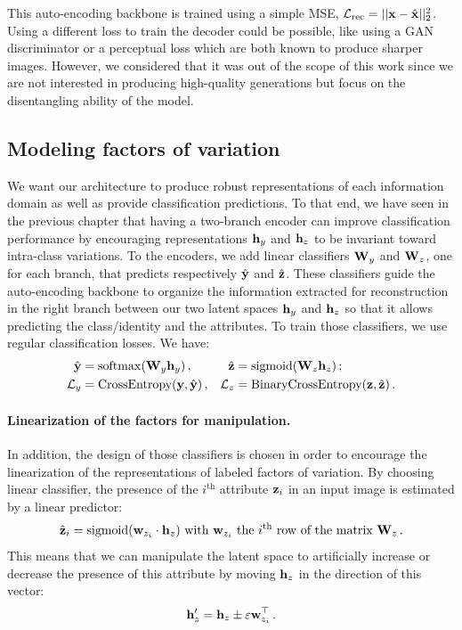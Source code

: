 This auto-encoding backbone is trained using a simple \ac{MSE}, $\mathcal{L}_\textrm{rec} = ||\mathbf{x} - \hat{\mathbf{x}}||_2^2$. Using a different loss to train the decoder could be possible, like using a GAN discriminator \citep{Goodfellow2014} or a perceptual loss \citep{dosovitskiy2016generating} which are both known to produce sharper images. However, we considered that it was out of the scope of this work since we are not interested in producing high-quality generations but focus on the disentangling ability of the model.


\subsection{Modeling factors of variation}\label{dualdis:sec:model_factors}

We want our architecture to produce robust representations of each information domain as well as provide classification predictions. To that end, we have seen in the previous chapter that having a two-branch encoder can improve classification performance by encouraging representations $\mathbf{h}_y$ and $\mathbf{h}_z$ to be invariant toward intra-class variations. To the encoders, we add linear classifiers $\mathbf{W}_y$ and $\mathbf{W}_z$, one for each branch, that predicts respectively $\hat{\mathbf{y}}$ and $\hat{\mathbf{z}}$. These classifiers guide the auto-encoding backbone to organize the information extracted for reconstruction in the right branch between our two latent spaces $\mathbf{h}_y$ and $\mathbf{h}_z$ so that it allows predicting the class/identity and the attributes. To train those classifiers, we use regular classification losses. We have:
\begin{align}
    \hat{\mathbf{y}} &= \operatorname*{softmax}(\mathbf{W}_y \mathbf{h}_y) \,, & \hat{\mathbf{z}} &= \operatorname{sigmoid}(\mathbf{W}_z \mathbf{h}_z) \,; \\
    \mathcal{L}_{y} &= \textrm{CrossEntropy}(\mathbf{y}, \hat{\mathbf{y}})         \,, &
    \mathcal{L}_{z} &= \textrm{BinaryCrossEntropy}(\mathbf{z}, \hat{\mathbf{z}})   \,.
\end{align}

\paragraph{Linearization of the factors for manipulation.} In addition, the design of those classifiers is chosen in order to encourage the linearization of the representations of labeled factors of variation. By choosing linear classifier, the presence of the $i^\text{th}$ attribute $\mathbf{z}_i$ in an input image is estimated by a linear predictor:
\begin{equation}
    \hat{\mathbf{z}}_i = \operatorname{sigmoid}(\mathbf{w}_{z_i} \cdot \mathbf{h}_z)\text{ with }\mathbf{w}_{z_i}\text{ the }i^\text{th}\text{ row of the matrix }\mathbf{W}_z\, .
\end{equation}
This means that we can manipulate the latent space to artificially increase or decrease the presence of this attribute by moving $\mathbf{h}_z$ in the direction of this vector:
\begin{equation}
    \mathbf{h}_z' = \mathbf{h}_z \pm \varepsilon \mathbf{w}_{z_i}^\top\,.
\end{equation}

